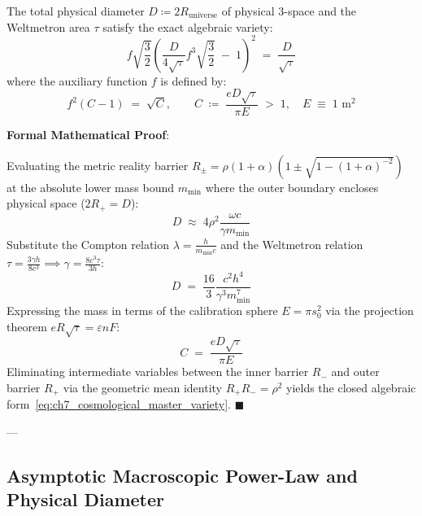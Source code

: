 \documentclass[
    12pt,
    a4paper,
    headings=normal,
    twoside=false,
    open=any,
    parskip=half
]{scrbook}
\newenvironment{myproof}[1][]{%
  \par\vspace{6pt}\noindent\textbf{\sffamily\color{maincolor}Formal Mathematical Proof\ifstrempty{#1}{}{ (#1)}}:\par\nopagebreak
}{%
  \penalty50\hfill\ensuremath{\blacksquare}\par\vspace{6pt}
}
\begin{document}
\begin{phystheorem}\label{thm:ch7_cosmological_equation_master}
The total physical diameter $D \coloneqq 2R_{\text{universe}}$ of physical 3-space and the Weltmetron area $\tau$ satisfy the exact algebraic variety:
\begin{equation}
\boxed{f \sqrt{\frac{3}{2}} \left( \frac{D}{4\sqrt{\tau}} f^3 \sqrt{\frac{3}{2}} \;-\; 1 \right)^2 \;=\; \frac{D}{\sqrt{\tau}}}
\label{eq:ch7_cosmological_master_variety}
\end{equation}
where the auxiliary function $f$ is defined by:
\begin{equation}
f^2(C - 1) \;=\; \sqrt{C}, \qquad C \;\coloneqq\; \frac{e D \sqrt{\tau}}{\pi E} \;>\; 1, \quad E \;\equiv\; 1 \text{ m}^2
\label{eq:ch7_auxiliary_function_f}
\end{equation}
\end{phystheorem}

\begin{myproof}
Evaluating the metric reality barrier $R_\pm = \rho(1 + \alpha)(1 \pm \sqrt{1 - (1 + \alpha)^{-2}})$ at the absolute lower mass bound $m_{\min}$ where the outer boundary encloses physical space ($2R_+ = D$):
\begin{equation*}
D \;\approx\; 4\rho^2 \frac{\omega c}{\gamma m_{\min}}
\end{equation*}
Substitute the Compton relation $\lambda = \frac{h}{m_{\min}c}$ and the Weltmetron relation $\tau = \frac{3\gamma h}{8c^3} \implies \gamma = \frac{8c^3\tau}{3h}$:
\begin{equation*}
D \;=\; \frac{16}{3} \frac{c^2 h^4}{\gamma^3 m_{\min}^7}
\end{equation*}
Expressing the mass in terms of the calibration sphere $E = \pi s_0^2$ via the projection theorem $e R \sqrt{\tau} = \varepsilon n F$:
\begin{equation*}
C \;=\; \frac{e D \sqrt{\tau}}{\pi E}
\end{equation*}
Eliminating intermediate variables between the inner barrier $R_-$ and outer barrier $R_+$ via the geometric mean identity $R_+ R_- = \rho^2$ yields the closed algebraic form~\eqref{eq:ch7_cosmological_master_variety}.
\end{myproof}

---

\subsection{Asymptotic Macroscopic Power-Law and Physical Diameter}
\end{document}
